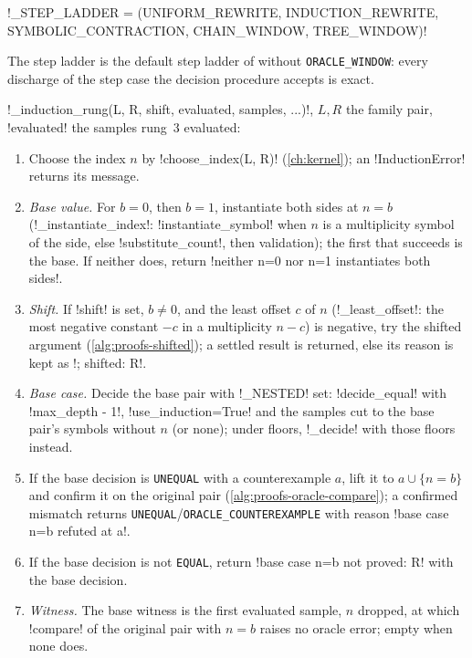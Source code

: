 \begin{signature}
\py!_STEP_LADDER = (UNIFORM_REWRITE, INDUCTION_REWRITE, SYMBOLIC_CONTRACTION, CHAIN_WINDOW, TREE_WINDOW)!
\end{signature}
The step ladder is the default step ladder of  without \texttt{ORACLE\_WINDOW}: every discharge of the step case the decision procedure accepts is exact.

\begin{algorithm}\label{alg:proofs-induction}
\py!_induction_rung(L, R, shift, evaluated, samples, ...)!, $L,R$ the family pair, \py!evaluated! the samples rung~3 evaluated:
\begin{enumerate}
\item Choose the index $n$ by \py!choose_index(L, R)! (\cref{ch:kernel}); an \py!InductionError! returns its message.
\item \emph{Base value.} For $b=0$, then $b=1$, instantiate both sides at $n=b$ (\py!_instantiate_index!: \py!instantiate_symbol! when $n$ is a multiplicity symbol of the side, else \py!substitute_count!, then validation); the first that succeeds is the base. If neither does, return \code!neither n=0 nor n=1 instantiates both sides!.
\item \emph{Shift.} If \py!shift! is set, $b\neq0$, and the least offset $c$ of $n$ (\py!_least_offset!: the most negative constant $-c$ in a multiplicity $n-c$) is negative, try the shifted argument (\cref{alg:proofs-shifted}); a settled result is returned, else its reason is kept as \code!; shifted: R!.
\item \emph{Base case.} Decide the base pair with \py!_NESTED! set: \py!decide_equal! with \py!max_depth - 1!, \py!use_induction=True! and the samples cut to the base pair's symbols without $n$ (or none); under floors, \py!_decide! with those floors instead.
\item If the base decision is \texttt{UNEQUAL} with a counterexample $a$, lift it to $a\cup\{n=b\}$ and confirm it on the original pair (\cref{alg:proofs-oracle-compare}); a confirmed mismatch returns \texttt{UNEQUAL}/\allowbreak\texttt{ORACLE\_COUNTEREXAMPLE} with reason \code!base case n=b refuted at {a}!.
\item If the base decision is not \texttt{EQUAL}, return \code!base case n=b not proved: R! with the base decision.
\item \emph{Witness.} The base witness is the first evaluated sample, $n$ dropped, at which \py!compare! of the original pair with $n=b$ raises no oracle error; empty when none does.

\end{enumerate}
\end{algorithm}
